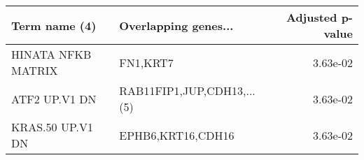 \begin{tabular}{llr}
\toprule
     Term name (4) &       Overlapping genes... &  Adjusted p-value \\
\midrule
HINATA NFKB MATRIX &                   FN1,KRT7 &          3.63e-02 \\
     ATF2 UP.V1 DN & RAB11FIP1,JUP,CDH13,...(5) &          3.63e-02 \\
  KRAS.50 UP.V1 DN &          EPHB6,KRT16,CDH16 &          3.63e-02 \\
\bottomrule
\end{tabular}
